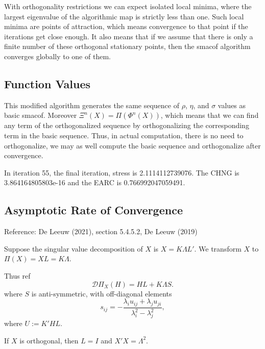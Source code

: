 \documentclass[
  12pt,
]{article}
\begin{document}
With orthogonality restrictions we can expect isolated local minima, where the
largest eigenvalue of the algorithmic map is strictly less than one. Such
local minima are points of attraction, which means convergence to that point
if the iterations get close enough. It also means that if we assume that
there is only a finite number of these orthogonal stationary points, then
the smacof algorithm converges globally to one of them.

\subsection{Function Values}\label{function-values-1}

This modified algorithm generates the same sequence of
\(\rho\), \(\eta\), and \(\sigma\) values as basic smacof.
Moreover \(\Xi^n(X)=\Pi(\Phi^n(X))\),
which means that we can find any term of the orthogonalized sequence
by orthogonalizing the corresponding term in the basic sequence.
Thus, in actual computation, there is no need to orthogonalize, we
may as well compute the basic sequence and orthogonalize after
convergence.

In iteration 55, the final iteration, stress is 2.1114112739076. The CHNG is 3.864164805803e-16 and the EARC is 0.766992047059491.

\subsection{Asymptotic Rate of Convergence}\label{asymptotic-rate-of-convergence-1}

Reference: De Leeuw (2021), section 5.4.5.2, De Leeuw (2019)

Suppose the singular value decomposition of \(X\) is \(X=K\Lambda L'\).
We transform \(X\) to \(\Pi(X)=XL=K\Lambda\).

Thus ref
\begin{equation}
\mathcal{D}\Pi_X(H)=HL+K\Lambda S.
\label{eq:finalpca}
\end{equation}
where \(S\) is anti-symmetric, with off-diagonal elements
\begin{equation}
s_{ij}=-\frac{\lambda_i u_{ij}+\lambda_j u_{ji}}{\lambda_i^2-\lambda_j^2},
\label{eq:spca}
\end{equation}
where \(U:= K'HL\).

If \(X\) is orthogonal, then \(L=I\) and \(X'X=\Lambda^2\).
\end{document}
